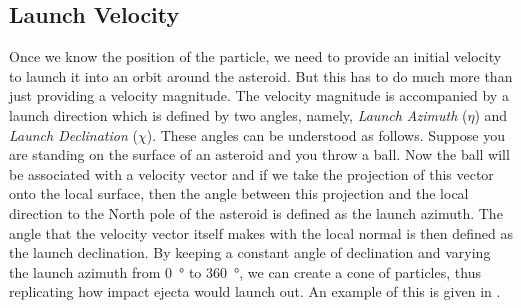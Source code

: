\subsection{Launch Velocity}
\label{subsec:launch_velocity}
Once we know the position of the particle, we need to provide an initial velocity to launch it into an orbit around the asteroid. But this has to do much more than just providing a velocity magnitude. The velocity magnitude is accompanied by a launch direction which is defined by two angles, namely, \emph{Launch Azimuth} ($\eta$) and \emph{Launch Declination} ($\chi$).
%
\newline\newline
%
These angles can be understood as follows. Suppose you are standing on the surface of an asteroid and you throw a ball. Now the ball will be associated with a velocity vector and if we take the projection of this vector onto the local surface, then the angle between this projection and the local direction to the North pole of the asteroid is defined as the launch azimuth. The angle that the velocity vector itself makes with the local normal is then defined as the launch declination. By keeping a constant angle of declination and varying the launch azimuth from \SI{0}{\degree} to \SI{360}{\degree}, we can create a cone of particles, thus replicating how impact ejecta would launch out. An example of this is given in .

